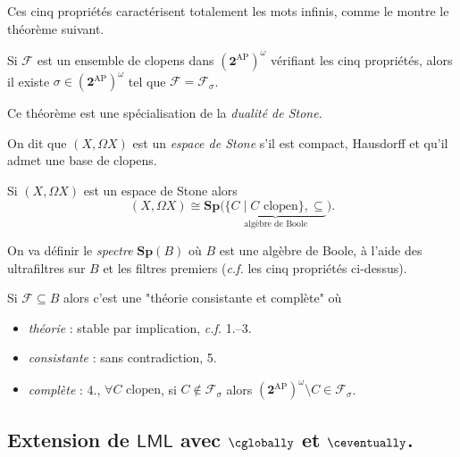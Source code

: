 \documentclass[./main]{subfiles}
\begin{document}
  Ces cinq propriétés caractérisent totalement les mots infinis, comme le montre le théorème suivant.

  \begin{thm}
    Si $\mathcal{F}$ est un ensemble de clopens dans $(\mathbf{2}^\mathrm{AP})^\omega$ vérifiant les cinq propriétés, alors il existe $\sigma \in (\mathbf{2}^\mathrm{AP})^\omega$ tel que $\mathcal{F} = \mathcal{F}_\sigma$.
  \end{thm}

  Ce théorème est une spécialisation de la \textit{dualité de Stone}.

  \begin{defn}
    On dit que $(X, \Omega X)$ est un \textit{espace de Stone} s'il est compact, Hausdorff et qu'il admet une base de clopens.
  \end{defn}

  \begin{thm}
    Si $(X, \Omega X)$ est un espace de Stone alors
    \[
      (X, \Omega X) \cong \mathbf{Sp}\big(\!\underbrace{\{C  \mid C \text{ clopen}\}, \subseteq}_{\text{algèbre de Boole}}\!\big)
    .\]
  \end{thm}

  On va définir le \textit{spectre} $\mathbf{Sp}(B)$ où $B$ est une algèbre de Boole, à l'aide des ultrafiltres sur $B$ et les filtres premiers (\textit{c.f.} les cinq propriétés ci-dessus).

  \begin{rmk}[Idée]
    Si $\mathcal{F} \subseteq B$ alors c'est une "théorie consistante et complète" où
    \begin{itemize}
      \item \textit{théorie} : stable par implication, \textit{c.f.} 1.--3.
      \item \textit{consistante} : sans contradiction, 5.
      \item \textit{complète} : 4., $\forall C \text{ clopen}$, si $C \not\in \mathcal{F}_\sigma$ alors $(\mathbf{2}^\mathrm{AP})^\omega \setminus C \in \mathcal{F}_\sigma$.
    \end{itemize}
  \end{rmk}

  \subsection{Extension de $\mathsf{LML}$ avec $\always$ et $\eventually$.}

  \renewcommand\qedsymbol{\textbf{QED}}
\end{document}
